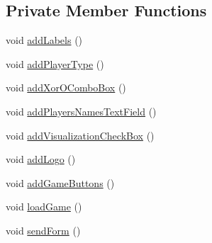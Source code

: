 \subsection*{Private Member Functions}
\begin{DoxyCompactItemize}
\item 
void \hyperlink{class_menu_1_1_menu_t_t_t_a48a8d83ac7c6e390507700574ddfabff}{add\+Labels} ()
\item 
void \hyperlink{class_menu_1_1_menu_t_t_t_ae2102ee7da27dee00625b813a5142143}{add\+Player\+Type} ()
\item 
void \hyperlink{class_menu_1_1_menu_t_t_t_ab2e2e48256d680705dac876219d404fb}{add\+Xor\+O\+Combo\+Box} ()
\item 
void \hyperlink{class_menu_1_1_menu_t_t_t_a2ff5a71570235793d9f9792b124cfaa8}{add\+Players\+Names\+Text\+Field} ()
\item 
void \hyperlink{class_menu_1_1_menu_t_t_t_aab64230cfcc735d5d7c921fff67eb371}{add\+Visualization\+Check\+Box} ()
\item 
void \hyperlink{class_menu_1_1_menu_t_t_t_a4f469514054ebd91fb4cf50e17aab7b3}{add\+Logo} ()
\item 
void \hyperlink{class_menu_1_1_menu_t_t_t_a605ea271b36acc1565d95db0c8469bfd}{add\+Game\+Buttons} ()
\item 
void \hyperlink{class_menu_1_1_menu_t_t_t_aeac6a368a9a21c6dc96bc01388f055ef}{load\+Game} ()
\item 
void \hyperlink{class_menu_1_1_menu_t_t_t_a62e5048bd2e1a44f351233f251f78496}{send\+Form} ()
\end{DoxyCompactItemize}
